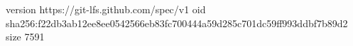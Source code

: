 version https://git-lfs.github.com/spec/v1
oid sha256:f22db3ab12ee8ee0542566eb83fc700444a59d285c701dc59ff993ddbf7b89d2
size 7591
